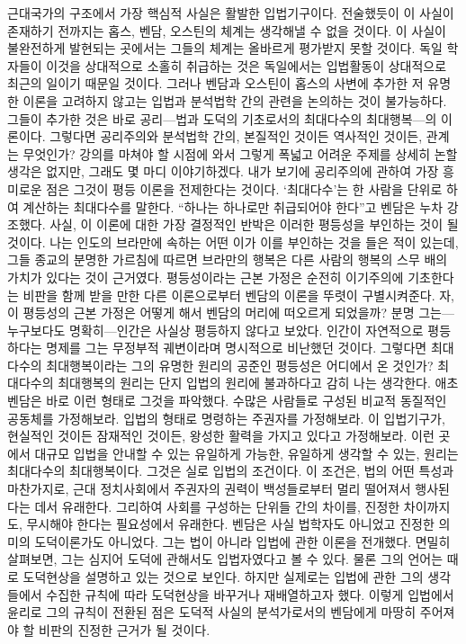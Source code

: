 근대국가의 구조에서 가장 핵심적 사실은 활발한 입법기구이다.
전술했듯이 이 사실이 존재하기 전까지는
홉스, 벤담, 오스틴의 체계는 생각해낼 수 없을 것이다.
이 사실이 불완전하게 발현되는 곳에서는 그들의 체계는 올바르게
평가받지 못할 것이다.
독일 학자들이 이것을 상대적으로 소홀히 취급하는 것은
독일에서는 입법활동이 상대적으로 최근의 일이기 때문일 것이다.
그러나
벤담과 오스틴이 홉스의 사변에 추가한 저 유명한 이론을
고려하지 않고는 입법과 분석법학 간의 관련을 논의하는 것이 불가능하다.
그들이 추가한 것은 바로 공리---법과 도덕의 기초로서의
최대다수의 최대행복---의 이론이다.
그렇다면 공리주의와 분석법학 간의, 본질적인 것이든 역사적인 것이든,
관계는 무엇인가?
강의를 마쳐야 할 시점에 와서 그렇게 폭넓고 어려운 주제를
상세히 논할 생각은 없지만, 그래도 몇 마디 이야기하겠다.
내가 보기에 공리주의에 관하여 가장 흥미로운 점은
그것이 평등 이론을 전제한다는 것이다.
`최대다수'는 한 사람을 단위로 하여 계산하는 최대다수를 말한다.
``하나는 하나로만 취급되어야 한다''고 벤담은 누차 강조했다.
사실, 이 이론에 대한 가장 결정적인 반박은 이러한 평등성을 부인하는 것이
될 것이다.
나는 인도의 브라만에 속하는 어떤 이가 이를 부인하는 것을 들은 적이 있는데,
그들 종교의 분명한 가르침에 따르면
브라만의 행복은 다른 사람의 행복의 스무 배의 가치가 있다는 것이 근거였다.
평등성이라는 근본 가정은 
순전히 이기주의에 기초한다는 비판을 함께 받을 만한 다른 이론으로부터
벤담의 이론을
뚜렷이 구별시켜준다.
자, 이 평등성의 근본 가정은 어떻게 해서 벤담의 머리에 떠오르게 되었을까?
분명 그는---누구보다도 명확히---인간은 사실상 평등하지 않다고 보았다.
인간이 자연적으로 평등하다는 명제를 그는
무정부적 궤변이라며 명시적으로 비난했던 것이다.
그렇다면
최대다수의 최대행복이라는 그의 유명한 원리의 공준인
평등성은 어디에서 온 것인가?
최대다수의 최대행복의 원리는 단지 입법의 원리에 불과하다고 감히 나는 생각한다.
애초 벤담은 바로 이런 형태로 그것을 파악했다.
수많은 사람들로 구성된 비교적 동질적인 공동체를 가정해보라.
입법의 형태로 명령하는 주권자를 가정해보라.
이 입법기구가, 현실적인 것이든 잠재적인 것이든,
왕성한 활력을 가지고 있다고 가정해보라.
이런 곳에서
대규모 입법을 안내할 수 있는 유일하게 가능한, 유일하게 생각할 수 있는,
원리는 최대다수의 최대행복이다.
그것은 실로 입법의 조건이다.
이 조건은,
법의 어떤 특성과 마찬가지로,
근대 정치사회에서 주권자의 권력이 백성들로부터 멀리 떨어져서 행사된다는 데서
유래한다.
그리하여 사회를 구성하는 단위들 간의 차이를, 진정한 차이까지도,
무시해야 한다는 필요성에서 유래한다.
벤담은 사실 법학자도 아니었고 진정한 의미의 도덕이론가도 아니었다.
그는 법이 아니라 입법에 관한 이론을 전개했다.
면밀히 살펴보면, 그는 심지어 도덕에 관해서도 입법자였다고 볼 수 있다.
물론 그의 언어는 때로 도덕현상을 설명하고 있는 것으로 보인다.
하지만 실제로는 입법에 관한 그의 생각들에서 수집한 규칙에 따라
도덕현상을 바꾸거나 재배열하고자 했다.
이렇게 입법에서 윤리로 그의 규칙이 전환된 점은
도덕적 사실의 분석가로서의 벤담에게 마땅히 주어져야 할
비판의 진정한 근거가 될 것이다.

